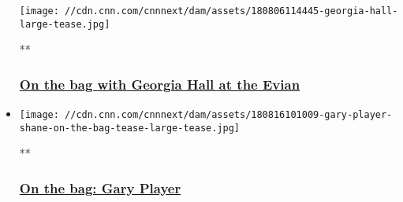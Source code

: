 \begin{itemize}
  \texttt{[image: //cdn.cnn.com/cnnnext/dam/assets/180806114445-georgia-hall-large-tease.jpg]}

  **

  \hypertarget{on-the-bag-with-georgia-hall-at-the-evian}{%
  \subsubsection{\texorpdfstring{\href{/videos/sports/2018/10/01/georgia-hall-on-the-bag-evian-championship-womens-british-open-living-golf-spt-intl.cnn}{On
  the bag with Georgia Hall at the
  Evian}}{On the bag with Georgia Hall at the Evian}}\label{on-the-bag-with-georgia-hall-at-the-evian}}
\item
  \href{/videos/sports/2018/08/15/gary-player-on-the-bag-caddy-wentworth-golf-club-2018-living-golf-spt-intl.cnn}{}

  \texttt{[image: //cdn.cnn.com/cnnnext/dam/assets/180816101009-gary-player-shane-on-the-bag-tease-large-tease.jpg]}

  **

  \hypertarget{on-the-bag-gary-player}{%
  \subsubsection{\texorpdfstring{\href{/videos/sports/2018/08/15/gary-player-on-the-bag-caddy-wentworth-golf-club-2018-living-golf-spt-intl.cnn}{On
  the bag: Gary
  Player}}{On the bag: Gary Player}}\label{on-the-bag-gary-player}}
\end{itemize}

